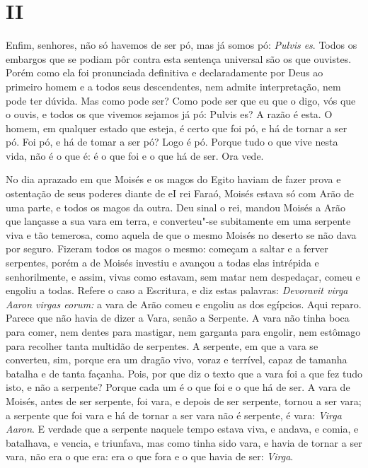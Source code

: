 \section{II}

Enfim, senhores, não só havemos de ser pó, mas já somos pó: \emph{Pulvis
es}. Todos os embargos que se podiam pôr contra esta sentença universal
são os que ouvistes. Porém como ela foi pronunciada definitiva e
declaradamente por Deus ao primeiro homem e a todos seus descendentes,
nem admite interpretação, nem pode ter dúvida. Mas como pode ser? Como
pode ser que eu que o digo, vós que o ouvis, e todos os que vivemos
sejamos já pó: Pulvis es?
A razão é esta. O homem, em qualquer estado que esteja, é certo que foi
pó, e há de tornar a ser pó. Foi pó, e há de tomar a ser pó? Logo é pó.
Porque tudo o que vive nesta vida, não é o que é: é o que foi e o que há
de ser. Ora vede.

No dia aprazado em que Moisés e os magos do Egito haviam de fazer prova
e ostentação de seus poderes diante de eI rei Faraó, Moisés estava só
com Arão de uma parte, e todos os magos da outra. Deu sinal o rei,
mandou Moisés a Arão que lançasse a sua vara em terra, e converteu"-se
subitamente em uma serpente viva e tão temerosa, como aquela de que o
mesmo Moisés no deserto se não dava por seguro. Fizeram todos os magos o
mesmo: começam a saltar e a ferver serpentes, porém a de Moisés investiu
e avançou a todas elas intrépida e senhorilmente, e assim, vivas como
estavam, sem matar nem despedaçar, comeu e engoliu a todas. Refere o
caso a Escritura, e diz estas palavras: \emph{Devoravit virga Aaron
virgas eorum:} a vara de Arão comeu e engoliu as dos egípcios. Aqui reparo.
Parece que não havia de dizer a Vara, senão a Serpente. A vara
não tinha boca para comer, nem dentes para mastigar, nem garganta para
engolir, nem estômago para recolher tanta multidão de serpentes. A
serpente, em que a vara se converteu, sim, porque era um dragão vivo,
voraz e terrível, capaz de tamanha batalha e de tanta façanha. Pois, por
que diz o texto que a vara foi a que fez tudo isto, e não a serpente?
Porque cada um é o que foi e o que há de ser. A vara de Moisés, antes de
ser serpente, foi vara, e depois de ser serpente, tornou a ser vara; a
serpente que foi vara e há de tornar a ser vara não é serpente, é vara:
\emph{Virga Aaron}. E verdade que a serpente naquele tempo estava viva,
e andava, e comia, e batalhava, e vencia, e triunfava, mas como tinha
sido vara, e havia de tornar a ser vara, não era o que era: era o que
fora e o que havia de ser: \emph{Virga}.

